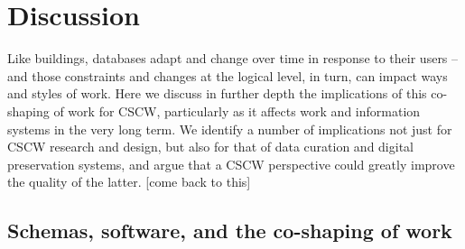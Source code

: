\section{Discussion}

Like buildings, databases adapt and change over time in response to their users -- and those constraints and changes at the logical level, in turn, can impact ways and styles of work.  Here we discuss in further depth the implications of this co-shaping of work for CSCW, particularly as it affects work and information systems in the very long term. We identify a number of implications not just for CSCW research and design, but also for that of data curation and digital preservation systems, and argue that a CSCW perspective could greatly improve the quality of the latter. [come back to this]

\subsection{Schemas, software, and the co-shaping of work}

